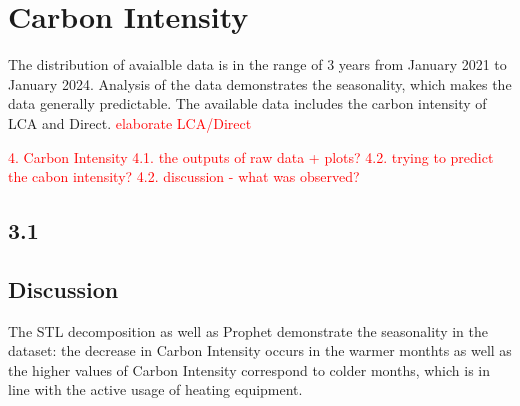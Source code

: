 \section{Carbon Intensity}
\noindent

The distribution of avaialble data is in the range of 3 years from January 2021 to January 2024. Analysis of the data demonstrates the seasonality, which makes the data generally predictable. The available data includes the carbon intensity of LCA and Direct. \textcolor{red}{elaborate LCA/Direct}

\textcolor{red}{4. Carbon Intensity 
4.1. the outputs of raw data + plots?
4.2. trying to predict the cabon intensity?
4.2. discussion - what was observed?}

\subsection{3.1}

\subsection{Discussion}

The STL decomposition as well as Prophet demonstrate the seasonality in the dataset: the decrease in Carbon Intensity occurs in the warmer monthts as well as the higher values of Carbon Intensity correspond to colder months, which is in line with the active usage of heating equipment.  